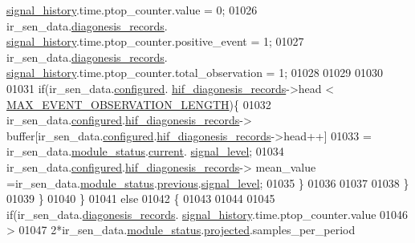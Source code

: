 \begin{DoxyCode}
{{      \hyperlink{a00017_affb63906d23cb1cb7787d61eaaedfb60}{signal\_history}.time.ptop\_counter.value              = 0;
01026                        ir\_sen\_data.\hyperlink{a00023_a7ae905b560513ad201e58c2f63375030}{diagonesis\_records}.
      \hyperlink{a00017_affb63906d23cb1cb7787d61eaaedfb60}{signal\_history}.time.ptop\_counter.positive\_event     = 1;
01027                        ir\_sen\_data.\hyperlink{a00023_a7ae905b560513ad201e58c2f63375030}{diagonesis\_records}.
      \hyperlink{a00017_affb63906d23cb1cb7787d61eaaedfb60}{signal\_history}.time.ptop\_counter.total\_observation  = 1;
01028 
01029 
01030 
01031                        \textcolor{keywordflow}{if}(ir\_sen\_data.\hyperlink{a00023_a94b2d1f6ea4ab334c74d24984dd27843}{configured}.
      \hyperlink{a00021_ae18294f7499d9fcb5ec796a1816b8cd8}{hif\_diagonesis\_records}->head < 
      \hyperlink{a00022_aa060aeb1ecb530b3c6f6d91060999b70}{MAX\_EVENT\_OBSERVATION\_LENGTH})\{
01032                        ir\_sen\_data.\hyperlink{a00023_a94b2d1f6ea4ab334c74d24984dd27843}{configured}.\hyperlink{a00021_ae18294f7499d9fcb5ec796a1816b8cd8}{hif\_diagonesis\_records}->
      buffer[ir\_sen\_data.\hyperlink{a00023_a94b2d1f6ea4ab334c74d24984dd27843}{configured}.\hyperlink{a00021_ae18294f7499d9fcb5ec796a1816b8cd8}{hif\_diagonesis\_records}->head++]
01033                        = ir\_sen\_data.\hyperlink{a00023_a5a53c391562b059eb744ac679f3765ca}{module\_status}.\hyperlink{a00017_ab8af48cdbba92b3ae39c4470e53af944}{current}.
      \hyperlink{a00017_abcdf2bc0c2e5a14863938ae28c3bc96e}{signal\_level};
01034                        ir\_sen\_data.\hyperlink{a00023_a94b2d1f6ea4ab334c74d24984dd27843}{configured}.\hyperlink{a00021_ae18294f7499d9fcb5ec796a1816b8cd8}{hif\_diagonesis\_records}->
      mean\_value =ir\_sen\_data.\hyperlink{a00023_a5a53c391562b059eb744ac679f3765ca}{module\_status}.\hyperlink{a00017_a0fc6d9ce6203a17f672c19d3d8747aee}{previous}.\hyperlink{a00017_abcdf2bc0c2e5a14863938ae28c3bc96e}{signal\_level};
01035                        \}
01036 
01037 
01038                     \}
01039                    \}
01040                  \}
01041                  \textcolor{keywordflow}{else}
01042                  \{
01043 
01044 
01045                     \textcolor{keywordflow}{if}(ir\_sen\_data.\hyperlink{a00023_a7ae905b560513ad201e58c2f63375030}{diagonesis\_records}.
      \hyperlink{a00017_affb63906d23cb1cb7787d61eaaedfb60}{signal\_history}.time.ptop\_counter.value
01046                     >
01047                     2*ir\_sen\_data.\hyperlink{a00023_a5a53c391562b059eb744ac679f3765ca}{module\_status}.\hyperlink{a00017_a6b2516d74583418cec324c50041421c9}{projected}.samples\_per\_period
}}
\end{DoxyCode}
